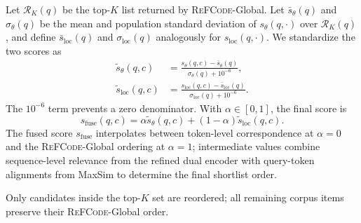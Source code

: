 \documentclass[11pt]{article}
\newcommand{\method}{\textsc{ReFCode}}
\begin{document}
Let \(\mathcal{R}_K(q)\) be the top-\(K\) list returned by \method{}-Global. Let \(\bar{s}_\theta(q)\) and \(\sigma_\theta(q)\) be the mean and population standard deviation of \(s_\theta(q,\cdot)\) over \(\mathcal{R}_K(q)\), and define \(\bar{s}_{\mathrm{loc}}(q)\) and \(\sigma_{\mathrm{loc}}(q)\) analogously for \(s_{\mathrm{loc}}(q,\cdot)\). We standardize the two scores as
\begin{equation}
  \begin{aligned}
    \widetilde{s}_\theta(q,c)
    &=\frac{s_\theta(q,c)-\bar{s}_\theta(q)}
      {\sigma_\theta(q)+10^{-6}},\\
    \widetilde{s}_{\mathrm{loc}}(q,c)
    &=\frac{s_{\mathrm{loc}}(q,c)-\bar{s}_{\mathrm{loc}}(q)}
      {\sigma_{\mathrm{loc}}(q)+10^{-6}}.
  \end{aligned}
  \label{eq:score_standardization}
\end{equation}
The \(10^{-6}\) term prevents a zero denominator.
With \(\alpha\in[0,1]\), the final score is
\begin{equation}
  s_{\mathrm{fuse}}(q,c)=\alpha\widetilde{s}_\theta(q,c)
  +(1-\alpha)\widetilde{s}_{\mathrm{loc}}(q,c).
  \label{eq:fusion}
\end{equation}
The fused score \(s_{\mathrm{fuse}}\) interpolates between token-level correspondence at \(\alpha=0\) and the \method{}-Global ordering at \(\alpha=1\); intermediate values combine sequence-level relevance from the refined dual encoder with query-token alignments from MaxSim to determine the final shortlist order.

Only candidates inside the top-\(K\) set are reordered; all remaining corpus items preserve their \method{}-Global order.
\end{document}
